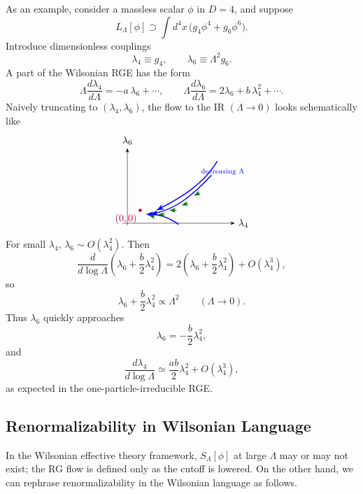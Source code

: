 As an example, consider a massless scalar \(\phi\) in \(D=4\), and suppose
\[
  L_\Lambda[\phi]\supset
  \int d^4x\,\bigl(g_4\phi^4+g_6\phi^6\bigr).
\]
Introduce dimensionless couplings
\[
  \lambda_4\equiv g_4,\qquad
  \lambda_6\equiv \Lambda^2 g_6 .
\]
A part of the Wilsonian RGE has the form
\[
  \Lambda\frac{d\lambda_4}{d\Lambda}
  =
  -a\,\lambda_6+\cdots,
  \qquad
  \Lambda\frac{d\lambda_6}{d\Lambda}
  =
  2\lambda_6+b\,\lambda_4^2+\cdots .
\]
Naively truncating to \((\lambda_4,\lambda_6)\), the flow to the IR
\((\Lambda\to0)\) looks schematically like
\[
\begin{tikzpicture}[>=Stealth,scale=0.84,baseline=(current bounding box.center)]
  \draw[->] (0,-.1)--(0,3.2) node[above] {\(\lambda_6\)};
  \draw[->] (-.2,0)--(4.6,0) node[right] {\(\lambda_4\)};
  \fill[purple] (.55,.55) circle (2pt) node[below left] {\((0,0)\)};
  \draw[blue,->,line width=1.05pt]
    (3.85,2.65) .. controls (3.25,1.65) and (2.3,1.1) .. (1.25,.55);
  \draw[blue,->,line width=1.05pt]
    (3.6,2.05) .. controls (2.8,1.2) and (2.1,.62) .. (1.0,.38);
  \draw[blue,->,line width=1.05pt]
    (2.2,-.05) .. controls (1.75,.25) and (1.3,.38) .. (.8,.38);
  \foreach \x/\y/\dx/\dy in {
    3.1/1.3/-.25/-.12,2.6/.85/-.28/-.08,2.1/.55/-.3/0,
    1.6/.35/-.28/.03,1.15/.28/-.23/.06}
    \draw[green!45!black,->,line width=.8pt] (\x,\y)--++(\dx,\dy);
  \node[blue,anchor=west] at (3.0,2.2) {\scriptsize decreasing \(\Lambda\)};
\end{tikzpicture}
\]
For small \(\lambda_4\), \(\lambda_6\sim O(\lambda_4^2)\).  Then
\[
  \frac{d}{d\log\Lambda}
  \left(\lambda_6+\frac{b}{2}\lambda_4^2\right)
  =
  2\left(\lambda_6+\frac{b}{2}\lambda_4^2\right)
  +O(\lambda_4^3),
\]
so
\[
  \lambda_6+\frac{b}{2}\lambda_4^2\propto\Lambda^2
  \qquad(\Lambda\to0).
\]
Thus \(\lambda_6\) quickly approaches
\[
  \lambda_6=-\frac{b}{2}\lambda_4^2,
\]
and
\[
  \frac{d\lambda_4}{d\log\Lambda}
  \simeq
  \frac{ab}{2}\lambda_4^2+O(\lambda_4^3),
\]
as expected in the one-particle-irreducible RGE.

\subsection{Renormalizability in Wilsonian Language}

In the Wilsonian effective theory framework, \(S_\Lambda[\phi]\) at large
\(\Lambda\) may or may not exist; the RG flow is defined only as the cutoff
is lowered.  On the other hand, we can rephrase renormalizability in the
Wilsonian language as follows.

